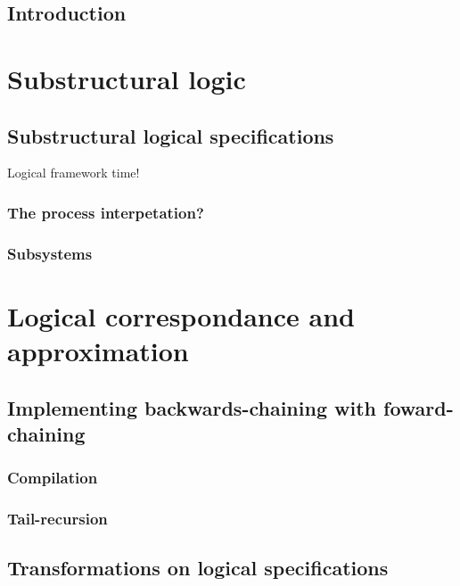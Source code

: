 \documentclass[12pt]{cmuthesis}
\begin{document}
\chapter{Introduction}

\part{Substructural logic}





\chapter{Substructural logical specifications}

Logical framework time!

\section{The process interpetation?}

\section{Subsystems}

\part{Logical correspondance and approximation}

\chapter{Implementing backwards-chaining with foward-chaining}

\section{Compilation}

\section{Tail-recursion}

\chapter{Transformations on logical specifications}
\end{document}
